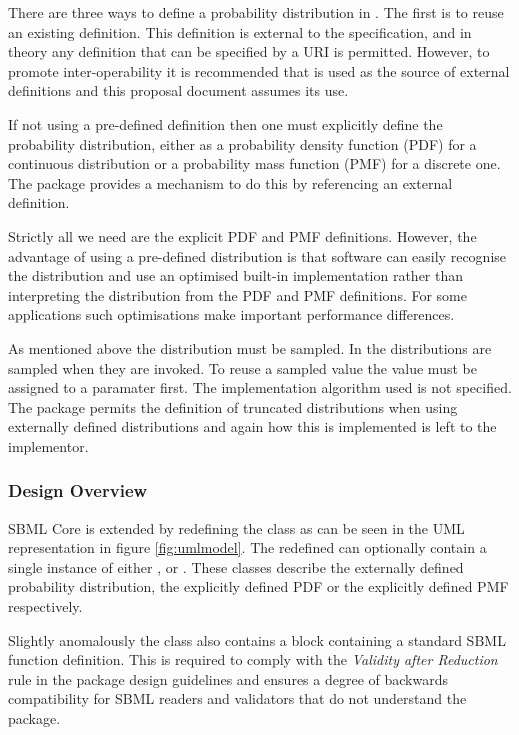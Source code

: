 \documentclass[draftspec]{sbmlpkgspec}
\begin{document}
There are three ways to define a probability distribution in
\distribshort. The first is to reuse an existing definition. This
definition is external to the \distribshort specification, and in
theory any definition that can be specified by a URI is permitted. However, to
promote inter-operability it is recommended that \uncertml is used as
the source of external definitions and this proposal document assumes
its use.

If not using a pre-defined definition then one must explicitly define
the probability distribution, either as a probability density function (PDF)
for a continuous distribution or a probability mass function (PMF) for
a discrete one. The \distrib package provides a mechanism to do this
by referencing an external definition.

Strictly all we need are the explicit PDF and PMF
definitions. However, the advantage of using a pre-defined
distribution is that software can easily recognise the distribution
and use an optimised built-in implementation rather than interpreting
the distribution from the PDF and PMF definitions. For some
applications such optimisations make important performance
differences.

As mentioned above the distribution must be sampled. In \distribshort
the distributions are sampled when they are invoked. To reuse a
sampled value the value must be assigned to a paramater first. The
implementation algorithm used is not specified. The package permits
the definition of truncated distributions when using externally
defined distributions and again how this is implemented is left to the
implementor.

\subsubsection{Design Overview}

SBML Core is extended by redefining the \FunctionDefinition class as
can be seen in the UML representation in figure
\vref{fig:umlmodel}. The redefined \FunctionDefinition can optionally
contain a single instance of either ,
 or . These classes describe the
externally defined probability distribution, the explicitly defined
PDF or the explicitly defined PMF respectively.

Slightly anomalously the \FunctionDefinition class also contains a
\mathml block containing a standard SBML function definition. This is
required to comply with the \emph{Validity after Reduction} rule in the
package design guidelines \cite{sbmll3v1packrule} and ensures a degree
of backwards compatibility for SBML readers and validators that do not
understand the \distribshort package.
\end{document}
